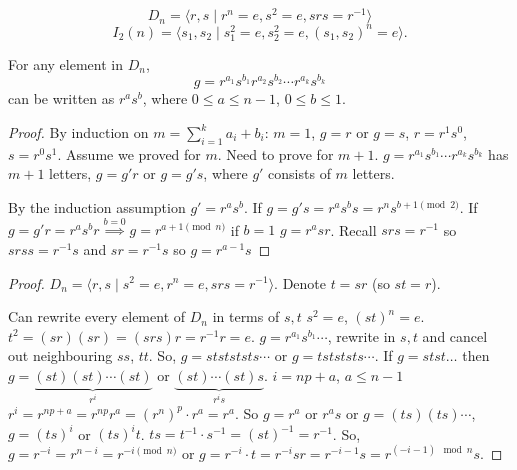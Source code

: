 \documentclass[10pt, a4paper]{article}
\begin{document}
\[
D_n = \langle r, s \mid r ^ n = e, s ^ 2 = e, srs = r ^ {-1}\rangle
\]
\[
I_2(n) = \langle s_1, s_2 \mid s_1 ^ 2 = e, s_2 ^ 2 = e, (s_1, s_2) ^ n = e\rangle.
\]

\begin{lemma}
    For any element in $D_n$,
    \[
    g = r ^ {a_1}s ^ {b_1}r ^ {a_2}s ^ {b_2}\dotsi r ^ {a_k}s ^ {b_k}
    \]
    can be written as $r ^ as ^ b$,
    where $0 \leq a \leq n - 1$,
    $0 \leq b \leq 1$.

    \begin{proof}
        By induction on $m = \sum_{i = 1}^{k}a_i + b_i$:
        $m = 1$,
        $g = r$ or $g = s$,
        $r = r ^ 1s ^ 0$,
        $s = r ^ 0s ^ 1$.
        Assume we proved for $m$.
        Need to prove for $m + 1$.
        $g = r ^ {a_1}s ^ {b_1} \dotsi r ^ {a_k}s ^ {b_k}$ has $m + 1$ letters,
        $g = g'r$ or $g = g's$,
        where $g'$ consists of $m$ letters.

        By the induction assumption $g' = r ^ as ^ b$.
        If $g = g's = r ^ as ^ bs = r ^ ns ^ {b + 1\pmod{2}}$.
        If $g = g'r = r ^ as ^ br \overset{b = 0}{\implies} g = r ^ {a + 1\pmod{n}}$
        if $b = 1$ $g = r ^ asr$.
        Recall $srs = r ^ {-1}$
        so $srss = r ^ {-1}s$ and $sr = r ^ {-1}s$
        so $g = r ^ {a - 1}s$
    \end{proof}

    \begin{proof}
        $D_n = \langle r, s \mid s ^ 2 = e, r ^ n = e, srs = r ^ {-1}\rangle$.
        Denote $t = sr$
        (so $st = r$).

        Can rewrite every element of $D_n$ in terms of $s, t$
        $s ^ 2 = e$,
        $(st) ^ n = e$.
        $t ^ 2 = (sr)(sr) = (srs)r = r ^ {-1}r = e$.
        $g = r ^ {a_1}s ^ {b_1}\dotsi$,
        rewrite in $s, t$ and cancel out neighbouring $ss$,
        $tt$.
        So,
        $g = ststststs\dotsi$ or $g = tstststs\dotsi$.
        If $g = stst\dotsc$ then $g = \underbrace{(st)(st)\dotsi (st)}_{r ^ i}$ or $\underbrace{(st)\dotsi(st)s}_{r ^ is}$.
        $i = np + a$,
        $a \leq n - 1$
        $r ^ i = r ^ {np + a} = r ^ {np}r ^ a = (r ^ n) ^ p \cdot r ^ a = r ^ a$.
        So $g = r ^ a$ or $r ^ as$ or $g = (ts)(ts) \dotsi$,
        $g = (ts) ^ i$ or $(ts) ^ it$.
        $ts = t ^ {-1}\cdot s ^ {-1} = (st) ^ {-1} = r ^ {-1}$.
        So,
        $g = r ^ {-i} = r ^ {n - i} = r ^ {-i\pmod{n}}$ or $g = r ^ {-i}\cdot t = r ^ {-i}sr = r ^{-i - 1}s = r ^ {(-i - 1)\mod{n}}s$.
    \end{proof}
\end{lemma}
\end{document}
